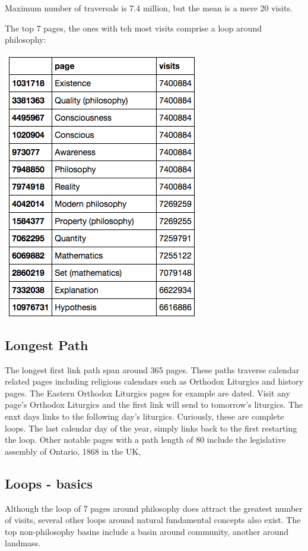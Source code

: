 \documentclass[twoside]{article}
\begin{document}
\begin{multicols}{2}
Maximum number of traversals is 7.4 million, but the mean is a mere 20 visits. 

The top 7 pages, the ones with teh most visits comprise a loop around philosophy:

\includegraphics[scale=0.5]{graphics/top_pages_list.png}

\subsection{Longest Path}

The longest first link path span around 365 pages. These paths traverse calendar related pages including religious calendars such as Orthodox Liturgics and history pages. The Eastern Orthodox Liturgics pages for example are dated. Visit any page's Orthodox Liturgics and the first link will send to tomorrow's liturgics. The enxt days links to the following day's liturgics. Curiously, these are complete loops. The last calendar day of the year, simply links back to the first restarting the loop. Other notable pages with a path length of 80 include the legislative assembly of Ontario, 1868 in the UK, 


\subsection{Loops - basics}
Although the loop of 7 pages around philosophy does attract the greatest number of visits, several other loops around natural fundamental concepts also exist. 
The top non-philosophy basins include a basin around community, another around landmass. 


\end{multicols}
\end{document}
